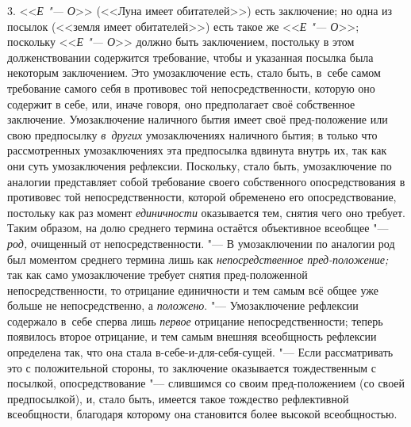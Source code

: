 3. <<{\em Е "--- О}>>
(<<Луна имеет обитателей>>) есть заключение; но одна из посылок
(<<земля имеет обитателей>>) есть такое же <<{\em Е "--- О}>>;
поскольку <<{\em Е "--- О}>>
должно быть заключением, постольку в этом долженствовании
содержится требование, чтобы и указанная посылка была некоторым
заключением. Это умозаключение есть, стало быть, в~себе самом требование
самого себя в противовес той непосредственности, которую оно содержит в
себе, или, иначе говоря, оно предполагает своё собственное заключение.
Умозаключение наличного бытия имеет своё пред-положение или свою
предпосылку {\em в~других}
умозаключениях наличного бытия; в только что
рассмотренных умозаключениях эта предпосылка вдвинута внутрь
их, так как они суть умозаключения рефлексии. Поскольку, стало быть,
умозаключение по аналогии представляет собой требование своего собственного
опосредствования в противовес той непосредственности, которой обременено
его опосредствование, постольку как раз момент
{\em единичности}
оказывается тем, снятия чего оно требует. Таким образом, на
долю среднего термина остаётся объективное всеобщее
"--- {\em род,} очищенный от
непосредственности. "--- В умозаключении по аналогии род был
моментом среднего термина лишь как
{\em непосредственное пред-положение;}
так как само умозаключение требует снятия пред-положенной
непосредственности, то отрицание единичности и тем самым всё общее уже
больше не непосредственно, а
{\em положено}. "---
Умозаключение рефлексии содержало в~себе сперва лишь
{\em первое} отрицание
непосредственности; теперь появилось второе отрицание, и тем самым внешняя
всеобщность рефлексии определена так, что она стала
в-себе-и-для-себя-сущей. "--- Если рассматривать это с
положительной стороны, то заключение оказывается тождественным с посылкой,
опосредствование "--- слившимся со своим пред-положением (со
своей предпосылкой), и, стало быть, имеется такое тождество рефлективной
всеобщности, благодаря которому она становится более высокой
всеобщностью.

